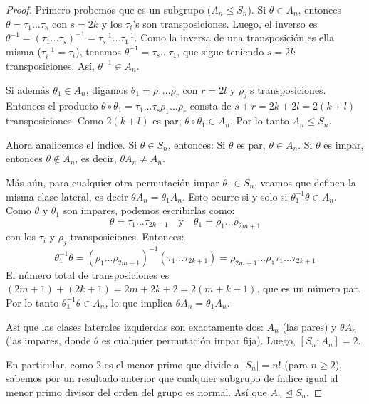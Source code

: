 \begin{proof}
    Primero probemos que es un subgrupo ($A_n \leq S_n$).
    Si $\theta \in A_n$, entonces $\theta = \tau_1 \dots \tau_s$ con $s=2k$ y los $\tau_i$'s son transposiciones.
    Luego, el inverso es $\theta^{-1} = (\tau_1 \dots \tau_s)^{-1} = \tau_s^{-1} \dots \tau_1^{-1}$.
    Como la inversa de una transposición es ella misma ($\tau_i^{-1} = \tau_i$), tenemos $\theta^{-1} = \tau_s \dots \tau_1$, que sigue teniendo $s=2k$ transposiciones. Así, $\theta^{-1} \in A_n$.

    Si además $\theta_1 \in A_n$, digamos $\theta_1 = \rho_1 \dots \rho_r$ con $r=2l$ y $\rho_j$'s transposiciones.
    Entonces el producto $\theta \circ \theta_1 = \tau_1 \dots \tau_s \rho_1 \dots \rho_r$ consta de $s+r = 2k + 2l = 2(k+l)$ transposiciones.
    Como $2(k+l)$ es par, $\theta \circ \theta_1 \in A_n$.
    Por lo tanto $A_n \leq S_n$.

    Ahora analicemos el índice. Si $\theta \in S_n$, entonces:
    Si $\theta$ es par, $\theta \in A_n$.
    Si $\theta$ es impar, entonces $\theta \notin A_n$, es decir, $\theta A_n \neq A_n$.
    
    Más aún, para cualquier otra permutación impar $\theta_1 \in S_n$, veamos que definen la misma clase lateral, es decir $\theta A_n = \theta_1 A_n$.
    Esto ocurre si y solo si $\theta_1^{-1} \theta \in A_n$.
    Como $\theta$ y $\theta_1$ son impares, podemos escribirlas como:
    \begin{equation*}
        \theta = \tau_1 \dots \tau_{2k+1} \quad \text{y} \quad \theta_1 = \rho_1 \dots \rho_{2m+1}
    \end{equation*}
    con los $\tau_i$ y $\rho_j$ transposiciones.
    Entonces:
    \begin{equation*}
        \theta_1^{-1} \theta = (\rho_1 \dots \rho_{2m+1})^{-1} (\tau_1 \dots \tau_{2k+1}) = \rho_{2m+1} \dots \rho_1 \tau_1 \dots \tau_{2k+1}
    \end{equation*}
    El número total de transposiciones es $(2m+1) + (2k+1) = 2m + 2k + 2 = 2(m+k+1)$, que es un número par.
    Por lo tanto $\theta_1^{-1} \theta \in A_n$, lo que implica $\theta A_n = \theta_1 A_n$.

    Así que las clases laterales izquierdas son exactamente dos: $A_n$ (las pares) y $\theta A_n$ (las impares, donde $\theta$ es cualquier permutación impar fija).
    Luego, $[S_n : A_n] = 2$.
    
    En particular, como 2 es el menor primo que divide a $|S_n|=n!$ (para $n \geq 2$), sabemos por un resultado anterior que cualquier subgrupo de índice igual al menor primo divisor del orden del grupo es normal.
    Así que $A_n \trianglelefteq S_n$.
\end{proof}

